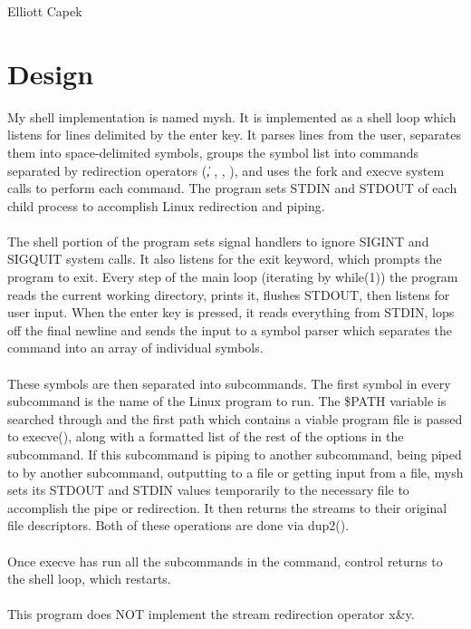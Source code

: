 \documentclass[11pt]{article}
\begin{document}
Elliott Capek \\

\section{Design}
My shell implementation is named mysh. It is implemented as a shell loop which listens for lines delimited by the enter key. It parses lines from the user, 
separates them into space-delimited symbols, groups the symbol list into commands separated by redirection operators (\|, \>, \>\>, \<), and uses the fork and execve
system calls to perform each command. The program sets STDIN and STDOUT of each child process to accomplish Linux redirection and piping.\\ \\
The shell portion of the program sets signal handlers to ignore SIGINT and SIGQUIT system calls. It also listens for the exit keyword, which prompts the 
program to exit. Every step of the main loop (iterating by while(1)) the program reads the current working directory, prints it, flushes STDOUT, then listens for
user input. When the enter key is pressed, it reads everything from STDIN, lops off the final newline and sends the input to a symbol parser which separates the
command into an array of individual symbols. \\ \\
These symbols are then separated into subcommands. The first symbol in every subcommand is the name of the Linux program to run. The \${PATH} variable is searched
through and the first path which contains a viable program file is passed to execve(), along with a formatted list of the rest of the options in the subcommand.
If this subcommand is piping to another subcommand, being piped to by another subcommand, outputting to a file or getting input from a file, mysh sets its 
STDOUT and STDIN values temporarily to the necessary file to accomplish the pipe or redirection. It then returns the streams to their original file descriptors.
Both of these operations are done via dup2(). \\ \\
Once execve has run all the subcommands in the command, control returns to the shell loop, which restarts. \\ \\
This program does NOT implement the stream redirection operator x\>\&y. 
\end{document}
